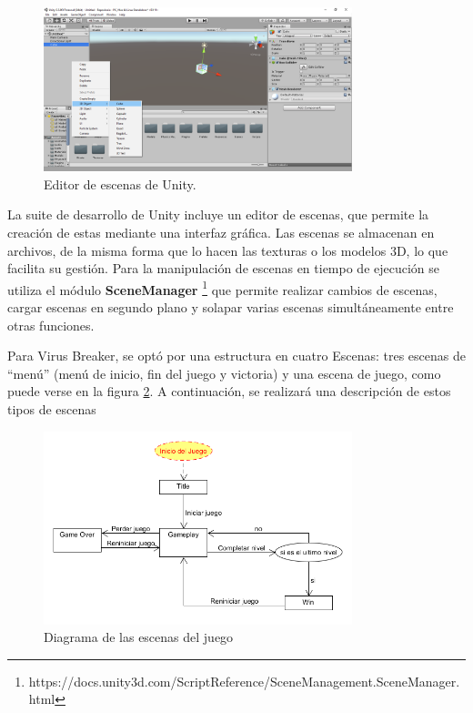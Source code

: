 \begin{figure}[h]
    \centering
    \includegraphics[width=0.8\textwidth]{images/estructura/escenas/editor}
    \caption{Editor de escenas de Unity.}
    \label{scene_editor}
\end{figure}

La suite de desarrollo de Unity incluye un editor de escenas, que permite la creación de estas mediante una interfaz gráfica. Las escenas se almacenan en archivos, de la misma forma que lo hacen las texturas o los modelos 3D, lo que facilita su gestión. Para la manipulación de escenas en tiempo de ejecución se utiliza el módulo \textbf{SceneManager} \footnote{https://docs.unity3d.com/ScriptReference/SceneManagement.SceneManager.html} que permite realizar cambios de escenas, cargar escenas en segundo plano y solapar varias escenas simultáneamente entre otras funciones. 

Para Virus Breaker, se optó por una estructura en cuatro Escenas: tres escenas de ``menú'' (menú de inicio, fin del juego y victoria) y una escena de juego, como puede verse en la figura \ref{scenes}. A continuación, se realizará una descripción de estos tipos de escenas

\begin{figure}[h]
	\includegraphics[width=0.8\textwidth]{images/estructura/escenas/scenes}
	\centering
	\caption{Diagrama de las escenas del juego}
	\label{scenes}
\end{figure}

